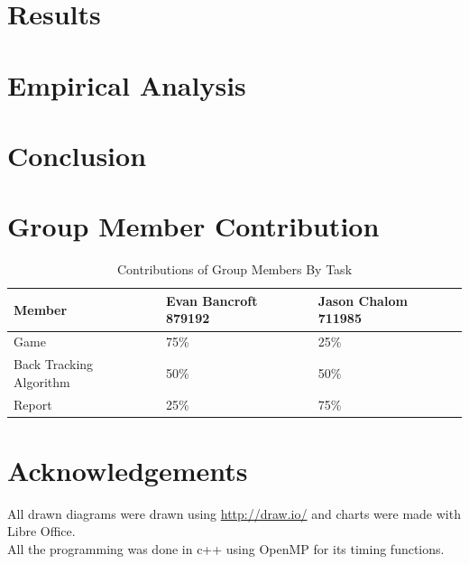 \documentclass[a4paper]{article}
\begin{document}
\section{Results}

\section{Empirical Analysis}


\section{Conclusion}

\section{Group Member Contribution}
\begin{table}[H]
\centering
\label{contribution}
\begin{tabular}{|l|l|l|}
\hline
\textbf{Member}         & \textbf{Evan Bancroft 879192} & \textbf{Jason Chalom 711985} \\ \hline
Game                    & 75\%                          & 25\%                         \\ \hline
Back Tracking Algorithm & 50\%                          & 50\%                         \\ \hline
Report                  & 25\%                          & 75\%                         \\ \hline
\end{tabular}
\caption{Contributions of Group Members By Task}
\end{table}

\section*{Acknowledgements}
All drawn diagrams were drawn using \url{http://draw.io/} and charts were made with Libre Office.\\ 
All the programming was done in c++ using OpenMP for its timing functions.\\



{}
\end{document}
